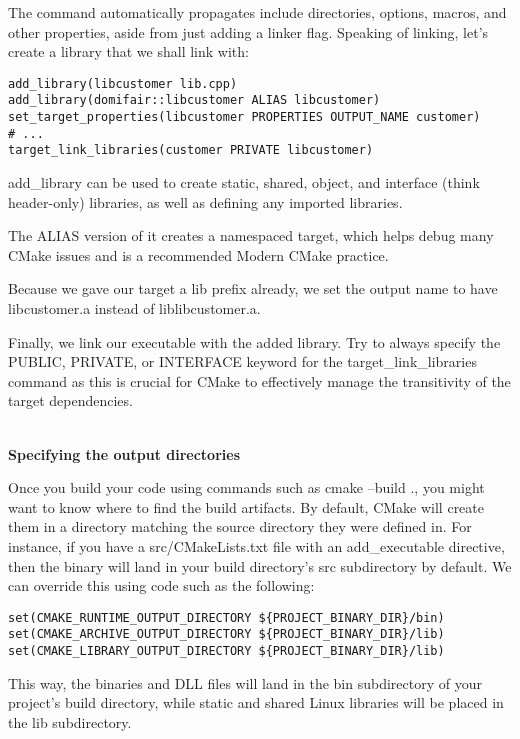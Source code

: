 The command automatically propagates include directories, options, macros, and other properties, aside from just adding a linker flag. Speaking of linking, let's create a library that we shall link with:

\begin{lstlisting}[style=styleCMake]
add_library(libcustomer lib.cpp)
add_library(domifair::libcustomer ALIAS libcustomer)
set_target_properties(libcustomer PROPERTIES OUTPUT_NAME customer)
# ...
target_link_libraries(customer PRIVATE libcustomer)
\end{lstlisting}

add\_library can be used to create static, shared, object, and interface (think header-only) libraries, as well as defining any imported libraries.

The ALIAS version of it creates a namespaced target, which helps debug many CMake issues and is a recommended Modern CMake practice.

Because we gave our target a lib prefix already, we set the output name to have libcustomer.a instead of liblibcustomer.a.

Finally, we link our executable with the added library. Try to always specify the PUBLIC, PRIVATE, or INTERFACE keyword for the target\_link\_libraries command as this is crucial for CMake to effectively manage the transitivity of the target dependencies.

\hspace*{\fill} \\ %
\noindent
\textbf{Specifying the output directories}

Once you build your code using commands such as cmake --build ., you might want to know where to find the build artifacts. By default, CMake will create them in a directory matching the source directory they were defined in. For instance, if you have a src/CMakeLists.txt file with an add\_executable directive, then the binary will land in your build directory's src subdirectory by default. We can override this using code such as the following: 

\begin{lstlisting}[style=styleCMake]
set(CMAKE_RUNTIME_OUTPUT_DIRECTORY ${PROJECT_BINARY_DIR}/bin)
set(CMAKE_ARCHIVE_OUTPUT_DIRECTORY ${PROJECT_BINARY_DIR}/lib)
set(CMAKE_LIBRARY_OUTPUT_DIRECTORY ${PROJECT_BINARY_DIR}/lib)
\end{lstlisting}

This way, the binaries and DLL files will land in the bin subdirectory of your project's build directory, while static and shared Linux libraries will be placed in the lib subdirectory.

